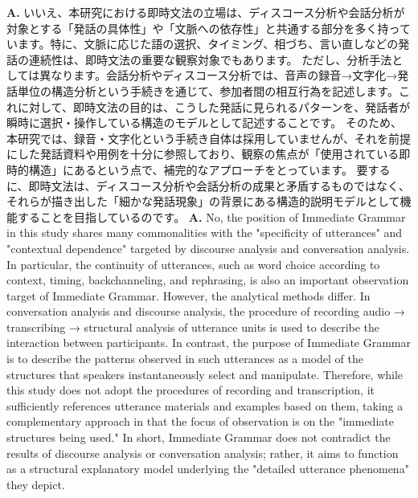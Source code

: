 \begin{enumerate}[resume, label=\textbf{Q\arabic*.}, leftmargin=2em]
\ifJPN
  \textbf{A.} いいえ、本研究における即時文法の立場は、ディスコース分析や会話分析が対象とする「発話の具体性」や「文脈への依存性」と共通する部分を多く持っています。特に、文脈に応じた語の選択、タイミング、相づち、言い直しなどの発話の連続性は、即時文法の重要な観察対象でもあります。
ただし、分析手法としては異なります。会話分析やディスコース分析では、音声の録音→文字化→発話単位の構造分析という手続きを通じて、参加者間の相互行為を記述します。これに対して、即時文法の目的は、こうした発話に見られるパターンを、発話者が瞬時に選択・操作している構造のモデルとして記述することです。
そのため、本研究では、録音・文字化という手続き自体は採用していませんが、それを前提にした発話資料や用例を十分に参照しており、観察の焦点が「使用されている即時的構造」にあるという点で、補完的なアプローチをとっています。
要するに、即時文法は、ディスコース分析や会話分析の成果と矛盾するものではなく、それらが描き出した「細かな発話現象」の背景にある構造的説明モデルとして機能することを目指しているのです。
\else
  \textbf{A.} No, the position of Immediate Grammar in this study shares many commonalities with the "specificity of utterances" and "contextual dependence" targeted by discourse analysis and conversation analysis. In particular, the continuity of utterances, such as word choice according to context, timing, backchanneling, and rephrasing, is also an important observation target of Immediate Grammar.
However, the analytical methods differ. In conversation analysis and discourse analysis, the procedure of recording audio → transcribing → structural analysis of utterance units is used to describe the interaction between participants. In contrast, the purpose of Immediate Grammar is to describe the patterns observed in such utterances as a model of the structures that speakers instantaneously select and manipulate.
Therefore, while this study does not adopt the procedures of recording and transcription, it sufficiently references utterance materials and examples based on them, taking a complementary approach in that the focus of observation is on the "immediate structures being used."
In short, Immediate Grammar does not contradict the results of discourse analysis or conversation analysis; rather, it aims to function as a structural explanatory model underlying the "detailed utterance phenomena" they depict.
\fi


\end{enumerate}
